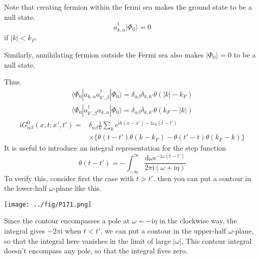 Note that creating fermion within the fermi sea makes the ground state to be a null state.
\begin{equation}
a^{\dagger}_{k,\alpha} |\Phi_0\rangle=0 \nonumber
\end{equation}
if $|k|<k_F$.

Similarly, annihilating fermion outside the Fermi sea also makes $|\Phi_0\rangle=0$ to be a null state.

Thus.
\begin{align}
 \langle\Phi_0|a_{k,\alpha}a^{\dagger}_{k',\beta}|\Phi_0\rangle=\delta_{\alpha\beta}\delta_{k,k'}\theta(|k|-k_F) \nonumber \\ \langle\Phi_0|a^{\dagger}_{k',\beta}a_{k,\alpha}|\Phi_0\rangle=\delta_{\alpha\beta}\delta_{k,k'}\theta(k_F-|k|) \nonumber 
\end{align}
\begin{align}
\mathrm{i}G^0_{\alpha\beta}(x,t;x',t')=&\delta_{\alpha\beta}\frac{1}{V}\sum_{k}e^{\mathrm{i}k(x-x')-\mathrm{i}\omega_{k}(t-t')} \nonumber\\
&\times\{\theta(t-t')\theta(k-k_F)-\theta(t'-t)\theta(k_F-k)\} \nonumber
\end{align}
It is useful to introduce an integral representation for the step function
\begin{equation}
\theta(t-t')=-\int_{-\infty}^{\infty} \frac{\mathrm{d}\omega e^{-\mathrm{i}\omega(t-t')}}{2\pi\mathrm{i}(\omega+\mathrm{i}\eta)} \nonumber
\end{equation}
To verify this, consider first the case with $t>t'$. then you can put a contour in the lower-half $\omega$-plane like this.
\begin{center}
\texttt{[image: ../fig/P171.png]}
\end{center}
Since the contour encompasses a pole at $\omega=-\mathrm{i}\eta$ in the clockwise way, the integral gives $-2\pi\mathrm{i}$ when $t<t'$, we can put a contour in the upper-half $\omega$-plane, so that the integral here vanishes in the limit of large $|\omega|$, This contour integral doesn't encompass any pole, so that the integral fives zero.

